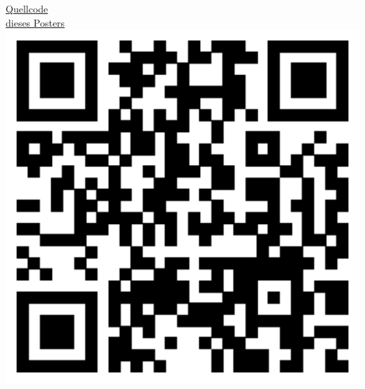 \begin{minipage}[t]{0.78\linewidth}
\printbibliography
\end{minipage}
\begin{minipage}[t]{0.2\linewidth}
	\vspace{0.3em}
	\centering\small \href{https://github.com/bbenno/mapr-wipr-poster}{Quellcode \\ dieses Posters}
	\includegraphics*[width=1.1\textwidth]{img/qr-code.eps}
	\vspace{-10em}
\end{minipage}
